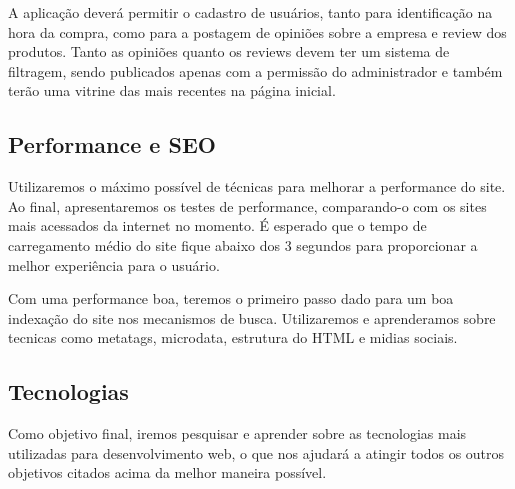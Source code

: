 A aplicação deverá permitir o cadastro de usuários, tanto para identificação na hora da compra, como para a postagem de opiniões sobre a empresa e review dos produtos. Tanto as opiniões quanto os reviews devem ter um sistema de filtragem, sendo publicados apenas com a permissão do administrador e também terão uma vitrine das mais recentes na página inicial.

\subsection{Performance e SEO}

Utilizaremos o máximo possível de técnicas para melhorar a performance do site. Ao final, apresentaremos os testes de performance, comparando-o com os sites mais acessados da internet no momento. É esperado que o tempo de carregamento médio do site fique abaixo dos 3 segundos para proporcionar a melhor experiência para o usuário. 

Com uma performance boa, teremos o primeiro passo dado para um boa indexação do site nos mecanismos de busca. Utilizaremos e aprenderamos sobre tecnicas como metatags, microdata, estrutura do HTML e midias sociais.

\subsection{Tecnologias}

Como objetivo final, iremos pesquisar e aprender sobre as tecnologias mais utilizadas para desenvolvimento web, o que nos ajudará a atingir todos os outros objetivos citados acima da melhor maneira possível.
